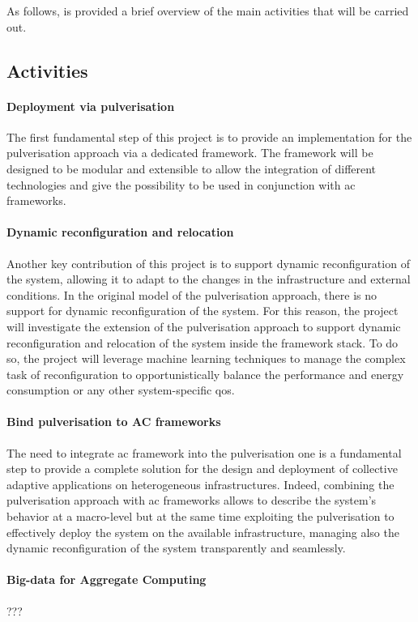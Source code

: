 \documentclass[12pt]{article}
\newcommand{\meta}[1]{{\color{blue}#1}}
\begin{document}
As follows, is provided a brief overview of the main activities that will be carried out.

\subsection{Activities}\label{subsec:activities}

\meta{
\paragraph{Deployment via pulverisation}
The first fundamental step of this project is to provide an implementation for
the pulverisation approach via a dedicated framework.
%
The framework will be designed to be modular and extensible to allow the integration
of different technologies and give the possibility to be used in conjunction with
\ac{ac} frameworks.

\paragraph{Dynamic reconfiguration and relocation}
Another key contribution of this project is to support dynamic reconfiguration of the system,
allowing it to adapt to the changes in the infrastructure and external conditions.
%
In the original model of the pulverisation approach,
there is no support for dynamic reconfiguration of the system.
%
For this reason,
the project will investigate the extension of the pulverisation approach
to support dynamic reconfiguration and relocation of the system inside the framework stack.
%
To do so,
the project will leverage machine learning techniques to manage the complex task of reconfiguration
to opportunistically balance the performance and energy consumption or any other system-specific \ac{qos}.

\paragraph{Bind pulverisation to AC frameworks}
The need to integrate \ac{ac} framework into the pulverisation one is
a fundamental step to provide a complete solution for the design and deployment of
collective adaptive applications on heterogeneous infrastructures.
%
Indeed, combining the pulverisation approach with \ac{ac} frameworks
allows to describe the system's behavior at a macro-level
but at the same time exploiting the pulverisation to
effectively deploy the system on the available infrastructure,
managing also the dynamic reconfiguration of the system transparently and seamlessly.

\paragraph{Big-data for Aggregate Computing}
???
}
\end{document}

